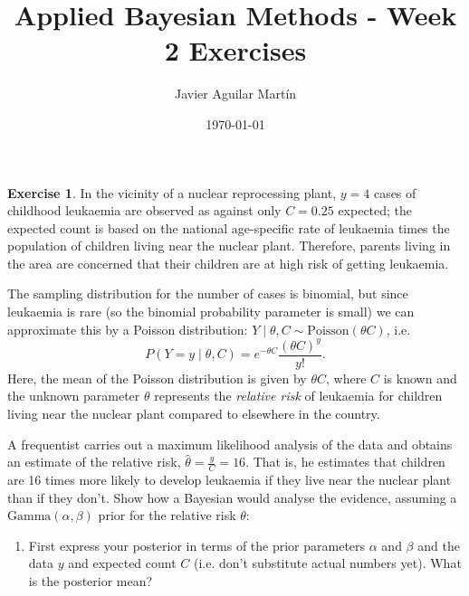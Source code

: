 \documentclass{article}
\theoremstyle{plain}
\theoremstyle{definition}
\newtheorem{exercise}{Exercise}
\begin{document}
\title{Applied Bayesian Methods - Week 2 Exercises}
\author{Javier Aguilar Martín}
\date{\today}
\maketitle
\begin{exercise}
In the vicinity of a nuclear reprocessing plant, $y = 4$ cases of childhood
leukaemia are observed as against only $C = 0.25$ expected; the expected
count is based on the national age-specific rate of leukaemia times the population of children living near the nuclear plant. Therefore, parents living in the area are concerned that their children are at high risk of getting leukaemia.

The sampling distribution for the number of cases is binomial, but since
leukaemia is rare (so the binomial probability parameter is small) we can
approximate this by a Poisson distribution: $Y\mid\theta ,C \sim\mathrm{Poisson}(\theta C)$, i.e.
\[
P(Y=y \mid \theta,C) = e^{-\theta C} \frac{(\theta C)^y}{y!}.
\]
Here, the mean of the Poisson distribution is given by $\theta C$, where $C$ is known and the unknown parameter $\theta$ represents the \emph{relative risk} of leukaemia for children living near the nuclear plant compared to elsewhere in the country.

A frequentist carries out a maximum likelihood analysis of the data and
obtains an estimate of the relative risk, $\hat{\theta} = \frac{y}{C} = 16$. That is, he estimates that children are 16 times more likely to develop leukaemia if they live near the nuclear plant than if they don't.
Show how a Bayesian would analyse the evidence, assuming a $\mathrm{Gamma}(\alpha,\beta)$ prior for the relative risk $\theta$:

\begin{enumerate}
\item  First express your posterior in terms of the prior parameters $\alpha$ and $\beta$ and the data $y$ and expected count $C$ (i.e. don't substitute actual numbers yet). What is the posterior mean?


\end{enumerate}
\end{exercise}
\end{document}

